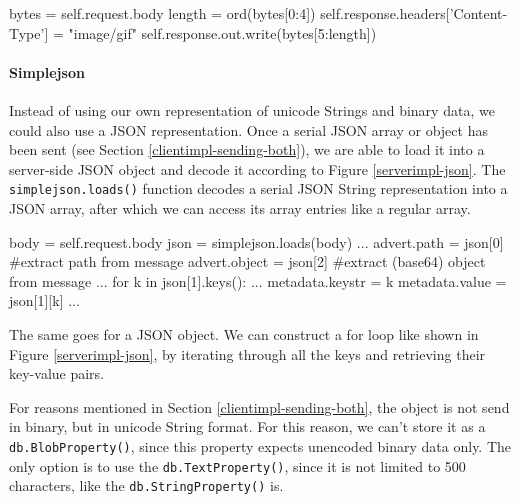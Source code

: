 \begin{figure*}[ht] %
\begin{center}
\begin{code}
bytes = self.request.body
length = ord(bytes[0:4])
self.response.headers['Content-Type'] = "image/gif"
self.response.out.write(bytes[5:length])
\end{code}
\caption{Manipulating a Raw String.\label{serverimpl-raw-string}}
\end{center}
\end{figure*}

\paragraph{Simplejson}
\label{serverimpl-simplejson}
Instead of using our own representation of unicode Strings and binary data, we
could also use a JSON representation. Once a serial JSON array or object has
been sent (see Section \ref{clientimpl-sending-both}), we are able to load it
into a server-side JSON object and decode it according to Figure
\ref{serverimpl-json}. The \texttt{simplejson.loads()} function decodes a
serial JSON String representation into a JSON array, after which we can access
its array entries like a regular array. 

\begin{figure*}[ht] %
\begin{center}
\begin{code}
body = self.request.body
json = simplejson.loads(body)
...
advert.path   = json[0] #extract path from message
advert.object = json[2] #extract (base64) object from message
...
for k in json[1].keys():
  ...
  metadata.keystr = k
  metadata.value  = json[1][k]
...
\end{code}
\caption{Decoding a JSON object.\label{serverimpl-json}}
\end{center}
\end{figure*}

The same goes for a JSON object. We can construct a for loop like shown in
Figure \ref{serverimpl-json}, by iterating through all the keys and retrieving
their key-value pairs.

For reasons mentioned in Section \ref{clientimpl-sending-both}, the object is
not send in binary, but in unicode String format. For this reason, we can't
store it as a \texttt{db.BlobProperty()}, since this property expects unencoded
binary data only. The only option is to use the \texttt{db.TextProperty()},
since it is not limited to 500 characters, like the \texttt{db.StringProperty()}
is.


